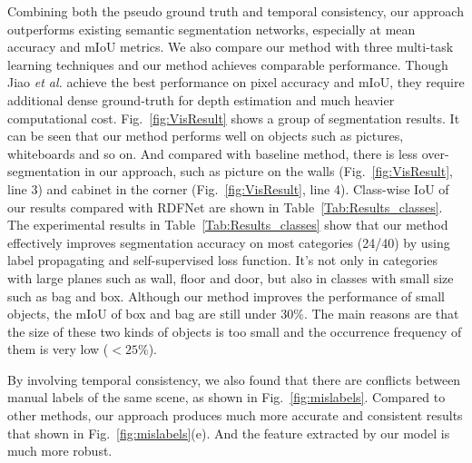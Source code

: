 Combining both the pseudo ground truth and temporal consistency, our approach outperforms existing semantic segmentation networks, especially at mean accuracy and mIoU metrics. 
%
We also compare our method with three multi-task learning techniques and our method achieves comparable performance.
%
Though Jiao \emph{et al.} achieve the best performance on pixel accuracy and mIoU, they require additional dense ground-truth for depth estimation and much heavier computational cost.
%
Fig.~\ref{fig:VisResult} shows a group of segmentation results. It can be seen that our method performs well on objects such as pictures, whiteboards and so on. 
%
And compared with baseline method, there is less over-segmentation in our approach, such as picture on the walls (Fig.~\ref{fig:VisResult}, line 3) and cabinet in the corner (Fig.~\ref{fig:VisResult}, line 4).
%
Class-wise IoU of our results compared with RDFNet\cite{Park2017} are shown in Table~\ref{Tab:Results_classes}.
%
The experimental results in Table~\ref{Tab:Results_classes} show that our method effectively improves segmentation accuracy on most categories (24/40) by using label propagating and self-supervised loss function.
%
It's not only in categories with large planes such as wall, floor and door, but also in classes with small size such as bag and box. 
%
Although our method improves the performance of small objects, the mIoU of box and bag are still under $30\%$. 
%
The main reasons are that the size of these two kinds of objects is too small and the occurrence frequency of them is very low ($<25\%$).
%

 By involving temporal consistency, we also found that there are conflicts between manual labels of the same scene, as shown in Fig.~\ref{fig:mislabels}. 
%
Compared to other methods, our approach produces much more accurate and consistent results that shown in Fig.~\ref{fig:mislabels}(e).
%
And the feature extracted by our model is much more robust.
%
%


